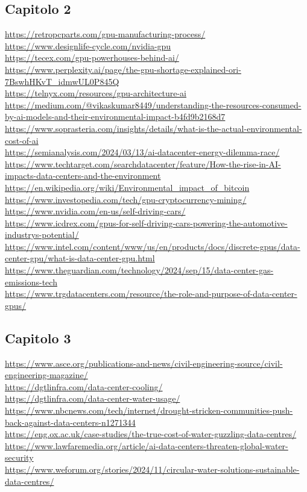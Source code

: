 \documentclass[12pt,a4paper,oneside]{book}
\begin{document}
\subsection*{Capitolo 2}
\url{https://retropcparts.com/gpu-manufacturing-process/} \\
\url{https://www.designlife-cycle.com/nvidia-gpu} \\
\url{https://tecex.com/gpu-powerhouses-behind-ai/} \\
\url{https://www.perplexity.ai/page/the-gpu-shortage-explained-ori-7BswhHKvT_idmwUL0P845Q} \\
\url{https://telnyx.com/resources/gpu-architecture-ai} \\
\url{https://medium.com/@vikaskumar8449/understanding-the-resources-consumed-by-ai-models-and-their-environmental-impact-b4fd9b2168d7} \\
\url{https://www.soprasteria.com/insights/details/what-is-the-actual-environmental-cost-of-ai} \\
\url{https://semianalysis.com/2024/03/13/ai-datacenter-energy-dilemma-race/} \\
\url{https://www.techtarget.com/searchdatacenter/feature/How-the-rise-in-AI-impacts-data-centers-and-the-environment} \\
\url{https://en.wikipedia.org/wiki/Environmental_impact_of_bitcoin} \\
\url{https://www.investopedia.com/tech/gpu-cryptocurrency-mining/} \\
\url{https://www.nvidia.com/en-us/self-driving-cars/} \\
\url{https://www.icdrex.com/gpus-for-self-driving-cars-powering-the-automotive-industrys-potential/} \\
\url{https://www.intel.com/content/www/us/en/products/docs/discrete-gpus/data-center-gpu/what-is-data-center-gpu.html} \\
\url{https://www.theguardian.com/technology/2024/sep/15/data-center-gas-emissions-tech} \\
\url{https://www.trgdatacenters.com/resource/the-role-and-purpose-of-data-center-gpus/}

\subsection*{Capitolo 3}
\url{https://www.asce.org/publications-and-news/civil-engineering-source/civil-engineering-magazine/} \\
\url{https://dgtlinfra.com/data-center-cooling/} \\
\url{https://dgtlinfra.com/data-center-water-usage/} \\
\url{https://www.nbcnews.com/tech/internet/drought-stricken-communities-push-back-against-data-centers-n1271344} \\
\url{https://eng.ox.ac.uk/case-studies/the-true-cost-of-water-guzzling-data-centres/} \\
\url{https://www.lawfaremedia.org/article/ai-data-centers-threaten-global-water-security} \\
\url{https://www.weforum.org/stories/2024/11/circular-water-solutions-sustainable-data-centres/}

\newpage
\end{document}
